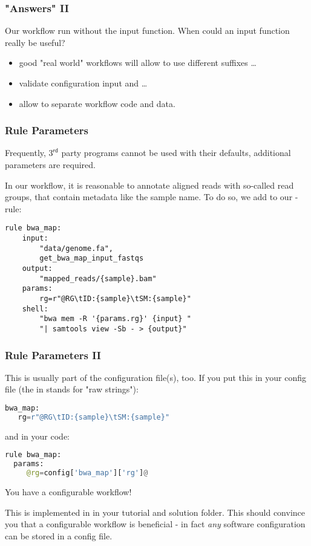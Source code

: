 \begin{frame}[fragile]
	\frametitle{"Answers" II}
	\begin{question}
    		Our workflow run without the input function. When could an input function really be useful?
	\end{question}
	\pause
	\begin{itemize}[<+->]
		\item good "real world" workflows will allow to use different suffixes \ldots
		\item validate configuration input and \ldots
		\item allow to separate workflow code and data.
	\end{itemize}
\end{frame}

\begin{frame}[fragile]
  \frametitle{Rule Parameters}
  \begin{warning}
  	Frequently, $3^\mathsf{rd}$ party programs cannot be used with their defaults, additional parameters are required.
  \end{warning}
  In our workflow, it is reasonable to annotate aligned reads with so-called read groups, that contain metadata like the sample name. \newline
  To do so, we add to our -rule:
  \begin{lstlisting}[style=Plain,basicstyle=\small]
rule bwa_map:
    input:
        "data/genome.fa",
        get_bwa_map_input_fastqs
    output:
        "mapped_reads/{sample}.bam"
    params:
        rg=r"@RG\tID:{sample}\tSM:{sample}"
    shell:
        "bwa mem -R '{params.rg}' {input} "
        "| samtools view -Sb - > {output}"
  \end{lstlisting}
\end{frame}

\begin{frame}[fragile]
  \frametitle{Rule Parameters II}
  This is usually part of the configuration file(s), too.\newline
  If you put this in your config file (the  in  stands for "raw strings"):
  \begin{lstlisting}[language=Python,style=Python]
bwa_map:
   rg=r"@RG\tID:{sample}\tSM:{sample}"
  \end{lstlisting}
  and in your code:
  \begin{lstlisting}[language=Python,style=Python]
rule bwa_map:
  params:
     @rg=config['bwa_map']['rg']@
  \end{lstlisting}
  You have a configurable workflow! 
  \begin{hint}
  	This is implemented in  in your tutorial and solution folder. This should convince you that a configurable workflow is beneficial - in fact \emph{any} software configuration can be stored in a config file.
  \end{hint}
\end{frame}

